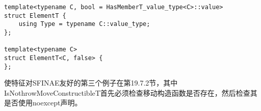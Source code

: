 \begin{lstlisting}[style=styleCXX]
template<typename C, bool = HasMemberT_value_type<C>::value>
struct ElementT {
	using Type = typename C::value_type;
};

template<typename C>
struct ElementT<C, false> {
};
\end{lstlisting}

使特征对SFINAE友好的第三个例子在第19.7.2节，其中IsNothrowMoveConstructibleT首先必须检查移动构造函数是否存在，然后检查其是否使用noexcept声明。













